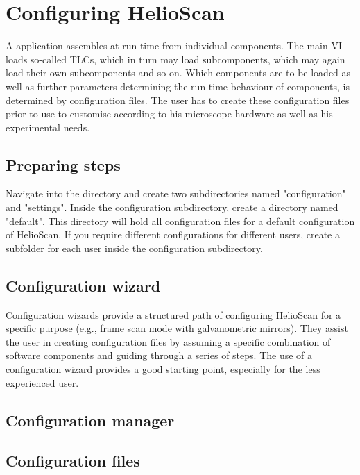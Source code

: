 \chapter{Configuring HelioScan}

A \HS application assembles at run time from individual components. The \HS main \ac{VI} loads so-called \acp{TLC}, which in turn may load subcomponents, which may again load their own subcomponents and so on. Which components are to be loaded as well as further parameters determining the run-time behaviour of components, is determined by configuration files. The user has to create these configuration files prior to use to customise \HS according to his microscope hardware as well as his experimental needs.



\section{Preparing steps}\label{sec:configuration_preparingSteps}
Navigate into the \HS directory and create two subdirectories named "configuration" and "settings". Inside the configuration subdirectory, create a directory named "default". This directory will hold all configuration files for a default configuration of HelioScan. If you require different configurations for different users, create a subfolder for each user inside the configuration subdirectory.

\section{Configuration wizard}\label{sec:configuring_configurationWizard}
Configuration wizards provide a structured path of configuring HelioScan for a specific purpose (e.g., frame scan mode with galvanometric mirrors). They assist the user in creating configuration files by assuming a specific combination of software components and guiding through a series of steps. The use of a configuration wizard provides a good starting point, especially for the less experienced user.

\section{Configuration manager}\label{sec:configuring_configurationManager}

\section{Configuration files}
